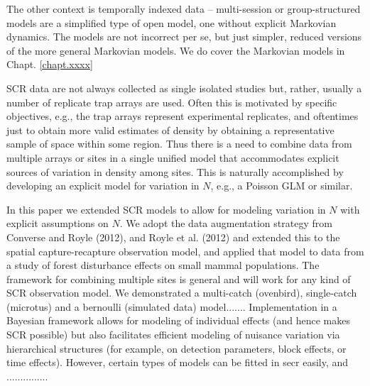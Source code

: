 The other context is temporally indexed data -- multi-session or
group-structured models are a simplified type of open model, one
without explicit Markovian dynamics. The models are not incorrect per
se, but just simpler, reduced versions of the more general Markovian
models. We do cover the Markovian models in Chapt. \ref{chapt.xxxx}


SCR data are not
always collected as single isolated studies but, rather, usually a number of
replicate trap arrays are used. Often this is motivated by specific
objectives, e.g., the trap arrays represent experimental replicates,
and oftentimes just to obtain more valid estimates of density by
obtaining a representative sample of space within some region.  Thus
there is a need to combine data from multiple arrays or sites in a
single unified model that accommodates explicit sources of variation
in density among sites.  This is naturally accomplished by developing
an explicit model for variation in $N$, e.g., a Poisson GLM or
similar.

In this paper we extended SCR models to allow for modeling variation
in $N$ with explicit assumptions on $N$. We adopt the data
augmentation strategy from Converse and Royle (2012), and Royle et
al. (2012) and extended this to the spatial capture-recapture
observation model, and applied that model to data from a study of
forest disturbance effects on small mammal populations.  
The framework for combining multiple sites is general and will
work for any kind of SCR observation model.
We demonstrated a multi-catch (ovenbird), single-catch (microtus)
and a bernoulli (simulated data) model.......
Implementation in a Bayesian framework allows for modeling
of individual effects (and hence makes SCR possible) but also
facilitates efficient modeling of nuisance variation via hierarchical
structures (for example, on detection parameters, block effects, or
time effects). However, certain types of models can be fitted in secr
easily, and ...............


